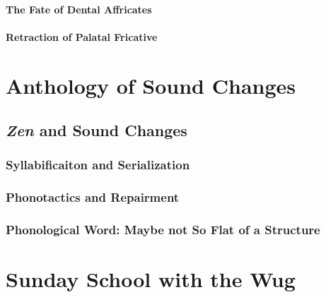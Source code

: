 \documentclass{report}[12pt]
\begin{document}
\begin{tcolorbox}
  
\end{tcolorbox}

\subsubsection*{The Fate of Dental Affricates}

\begin{tcolorbox}

\end{tcolorbox}

\subsubsection*{Retraction of Palatal Fricative}

\begin{tcolorbox}
  
\end{tcolorbox}

\chapter{Anthology of Sound Changes}

\section{\emph{Zen} and Sound Changes}

\subsection{Syllabificaiton and Serialization}

\subsection{Phonotactics and Repairment}

\subsection{Phonological Word: Maybe not So Flat of a Structure}

\chapter{Sunday School with the Wug}
\end{document}
